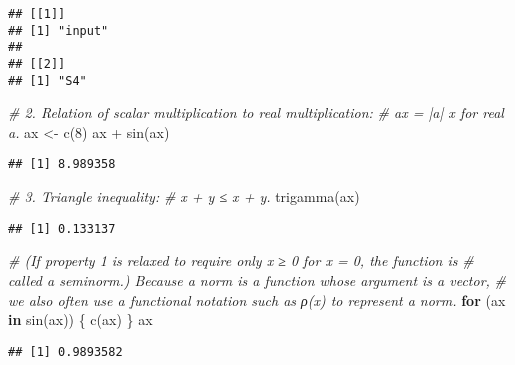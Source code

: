 \documentclass[
]{article}
\newenvironment{Shaded}{\begin{snugshade}}{\end{snugshade}}
\newcommand{\CommentTok}[1]{\textcolor[rgb]{0.56,0.35,0.01}{\textit{#1}}}
\newcommand{\ControlFlowTok}[1]{\textcolor[rgb]{0.13,0.29,0.53}{\textbf{#1}}}
\newcommand{\DecValTok}[1]{\textcolor[rgb]{0.00,0.00,0.81}{#1}}
\newcommand{\FunctionTok}[1]{\textcolor[rgb]{0.00,0.00,0.00}{#1}}
\newcommand{\NormalTok}[1]{#1}
\newcommand{\OtherTok}[1]{\textcolor[rgb]{0.56,0.35,0.01}{#1}}
\newcommand{\SpecialCharTok}[1]{\textcolor[rgb]{0.00,0.00,0.00}{#1}}
\begin{document}
\begin{verbatim}
## [[1]]
## [1] "input"
## 
## [[2]]
## [1] "S4"
\end{verbatim}

\begin{Shaded}
\begin{Highlighting}[]
\CommentTok{\# 2. Relation of scalar multiplication to real multiplication:}
\CommentTok{\# ax = |a| x for real a.}
\NormalTok{ax }\OtherTok{\textless{}{-}} \FunctionTok{c}\NormalTok{(}\DecValTok{8}\NormalTok{)}
\NormalTok{ax }\SpecialCharTok{+} \FunctionTok{sin}\NormalTok{(ax)}
\end{Highlighting}
\end{Shaded}

\begin{verbatim}
## [1] 8.989358
\end{verbatim}

\begin{Shaded}
\begin{Highlighting}[]
\CommentTok{\# 3. Triangle inequality:}
\CommentTok{\# x + y ≤ x + y.}
\FunctionTok{trigamma}\NormalTok{(ax)}
\end{Highlighting}
\end{Shaded}

\begin{verbatim}
## [1] 0.133137
\end{verbatim}

\begin{Shaded}
\begin{Highlighting}[]
\CommentTok{\# (If property 1 is relaxed to require only x ≥ 0 for x = 0, the function is}
\CommentTok{\# called a seminorm.) Because a norm is a function whose argument is a vector,}
\CommentTok{\# we also often use a functional notation such as ρ(x) to represent a norm.}
\ControlFlowTok{for}\NormalTok{ (ax }\ControlFlowTok{in} \FunctionTok{sin}\NormalTok{(ax)) \{}
  \FunctionTok{c}\NormalTok{(ax)}
\NormalTok{\}}
\NormalTok{ax}
\end{Highlighting}
\end{Shaded}

\begin{verbatim}
## [1] 0.9893582
\end{verbatim}
\end{document}

